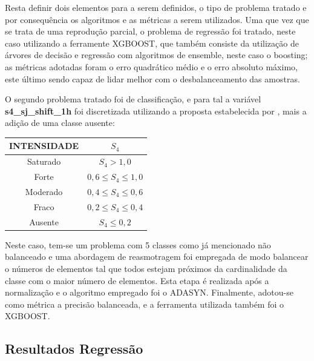 Resta definir dois elementos para a serem definidos, o tipo de problema tratado e por consequência os algoritmos e as métricas a serem utilizados. Uma que vez que se trata de uma reprodução parcial, o problema de regressão foi tratado, neste caso utilizando a ferramente XGBOOST, que também consiste da utilização de árvores de decisão e regressão com algoritmos de ensemble, neste caso o boosting; as métricas adotadas foram o erro quadrático médio e o erro absoluto máximo, este último sendo capaz de lidar melhor com o desbalanceamento das amostras.

O segundo problema tratado foi de classificação, e para tal a variável {\bf s4\_sj\_shift\_1h} foi discretizada utilizando a proposta estabelecida por \cite{MUELLA:2008}, mais a adição de uma classe ausente:

\begin{table}
\begin{center}
\begin{tabular}{|c|c|}
\hline
{\bf INTENSIDADE} & {\bf $S_4$} \\ \hline
Saturado          & $S_4 > 1,0$ \\ \hline
Forte             & $0,6 \le S_4 \le 1,0$ \\ \hline
Moderado          & $0,4 \le S_4 \le 0,6$ \\ \hline
Fraco             & $0,2 \le S_4 \le 0,4$ \\ \hline
Ausente           & $ S_4 \le 0,2 $ \\ \hline
\end{tabular}
\end{center}
\end{table}

Neste caso, tem-se um problema com 5 classes como já mencionado não balanceado e uma abordagem de reasmotragem foi empregada de modo balancear o números de elementos tal que todos estejam próximos da cardinalidade da classe com o maior número de elementos. Esta etapa é realizada após a normalização e o algoritmo empregado foi o ADASYN. Finalmente, adotou-se como métrica a precisão balanceada, e a ferramenta utilizada também foi o XGBOOST.

\subsection{Resultados Regressão}

